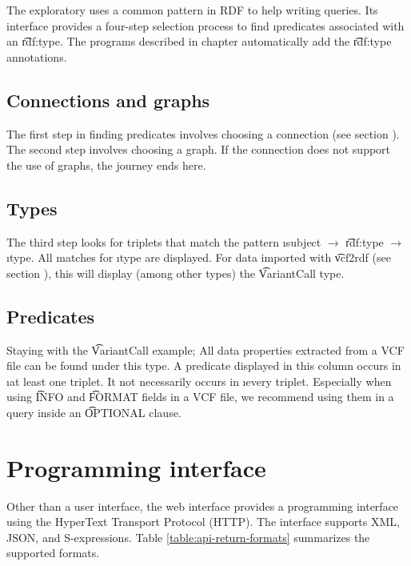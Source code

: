   The exploratory uses a common pattern in RDF to help writing queries.  Its
  interface provides a four-step selection process to find \i{predicates}
  associated with an \t{rdf:type}.  The programs described in chapter
   automatically add the \t{rdf:type} annotations.

\subsection{Connections and graphs}

  The first step in finding predicates involves choosing a connection
  (see section ).  The second step involves
  choosing a graph.  If the connection does not support the use of graphs,
  the journey ends here.

\subsection{Types}

  The third step looks for triplets that match the pattern \i{subject}
  $\rightarrow$ \t{rdf:type} $\rightarrow$ \i{type}.  All matches for
  \i{type} are displayed.  For data imported with \t{vcf2rdf} (see
  section ), this will display (among other types) the
  \t{VariantCall} type.

\subsection{Predicates}

  Staying with the \t{VariantCall} example;  All data properties extracted
  from a VCF file can be found under this type.  A predicate displayed in this
  column occurs in \i{at least} one triplet.  It not necessarily occurs in
  \i{every} triplet.  Especially when using \t{INFO} and \t{FORMAT}
  fields in a VCF file, we recommend using them in a query inside an
  \t{OPTIONAL} clause.

\pagebreak{}
\section{Programming interface}
\label{sec:web-api}

  Other than a user interface, the web interface provides a programming interface
  using the HyperText Transport Protocol (HTTP).  The interface supports XML,
  JSON, and S-expressions.  Table \ref{table:api-return-formats} summarizes the
  supported formats.

